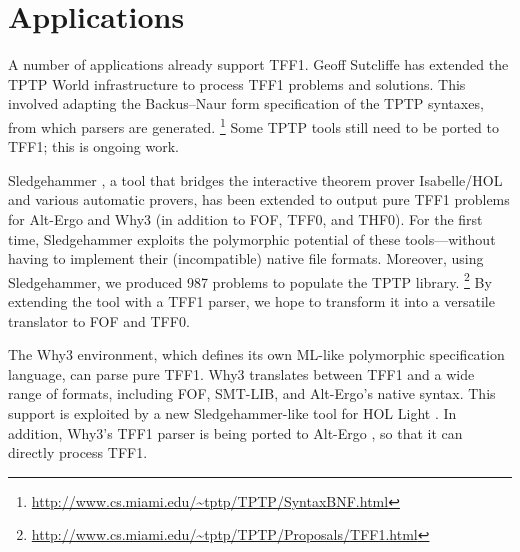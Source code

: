 \section{Applications}
\label{sec_apps}

A number of applications already support TFF1. Geoff
Sutcliffe has extended the TPTP World infrastructure to process TFF1 problems
and solutions. This involved adapting the Backus--Naur form specification of the
TPTP syntaxes, from which parsers are generated.%
\footnote{\url{http://www.cs.miami.edu/~tptp/TPTP/SyntaxBNF.html}}
Some TPTP tools still need to be ported to TFF1; this is ongoing work.


Sledgehammer \cite{paulson-blanchette-2010}, a tool that bridges the interactive
theorem prover Isabelle\slash HOL and various automatic provers, has been
extended to output pure TFF1 problems for Alt-Ergo and Why3
(in addition to FOF, TFF0, and THF0). For the first time, Sledgehammer
exploits the polymorphic potential of these tools---without having
to implement their (incompatible) native file formats.
Moreover, using Sledgehammer, we produced 987 problems to populate the TPTP
library.%
\footnote{\url{http://www.cs.miami.edu/~tptp/TPTP/Proposals/TFF1.html}}
By extending the tool with a TFF1 parser,
we hope to transform it into a versatile translator to FOF and
TFF0.

\pagebreak

The Why3 \cite{bobot-et-al-2011} environment, which defines its own ML-like
polymorphic specification language, can parse pure TFF1. Why3 translates
between TFF1 and a wide range of
formats, including FOF, SMT-LIB, and
Alt-Ergo's native syntax.
This support is exploited by a new Sledgehammer-like tool for HOL Light
\cite{kaliszyk-urban-2013}.
In addition, Why3's TFF1 parser is being ported to
Alt-Ergo \cite{bobot-et-al-2008}, so that it can directly process TFF1. %



